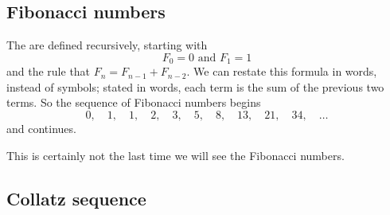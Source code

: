 \subsection{Fibonacci numbers}


The  are defined recursively, starting with
$$
F_0 = 0 \mbox{ and } F_1 = 1
$$
and the rule that $F_{n} = F_{n-1} + F_{n-2}$.  We can restate this
formula in words, instead of symbols; stated in words, each term is
the sum of the previous two terms.  So the sequence of Fibonacci
numbers begins 
$$
0, \quad 1, \quad 1, \quad 2, \quad 3, \quad 5, \quad 8, \quad 13, \quad 21, \quad 34, \quad\ldots
$$
and continues.

This is certainly not the last time we will see the Fibonacci numbers.

\subsection{Collatz sequence}

